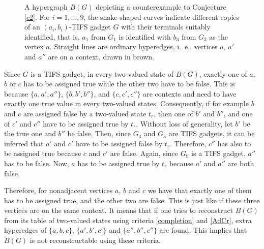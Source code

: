 \documentclass[%
12pt,
prereprint,
showpacs,
showkeys,
preprintnumbers,
amsmath,amssymb,
aps,
pra,
longbibliography,
notitlepage
]{revtex4-1}
\theoremstyle{definition}
\begin{document}
\begin{figure}
\begin{center}
{
			}
		\end{center}
		\caption{\label{TIFS-non-Rec}
			A hypergraph $B(G)$ depicting a counterexample to Conjecture \ref{c2}. For $i=1,\ldots ,9$, the snake-shaped curves indicate different copies of an $(a_i , b_i )$-TIFS gadget $G$ with their terminals suitably identified, that is, $a_1$ from $G_1$ is identified with $b_3$ from $G_3$ as the vertex $a$. Straight lines are ordinary hyperedges, i.~e., vertices $a$, $a'$ and $a''$ are on a context, drawn in brown.}
	\end{figure}
	
	Since $G$ is a TIFS gadget, in every two-valued state of $B(G)$, exactly one of $a$, $b$ or $c$ has to be assigned true while the other two have to be false. This is because $\{a,a',a''\}$, $\{b,b',b''\}$, and $\{c,c',c''\}$ are contexts and need to have exactly one true value in every two-valued states. Consequently, if for example $b$ and $c$ are assigned false by a two-valued state $t_r$, then one of $b'$ and $b''$, and one of $c'$ and $c''$ have to be assigned true by $t_r$. Without loss of generality, let $b'$ be the true one and $b''$ be false. Then, since $G_4$ and $G_5$ are TIFS gadgets, it can be inferred that $a'$ and $c'$ have to be assigned false by $t_r$. Therefore, $c''$ has also to be assigned true because $c$ and $c'$ are false. Again, since $G_9$ is a TIFS gadget, $a''$ has to be false. Now, $a$ has to be assigned true by $t_r$ because $a'$ and $a''$ are both false.
	
	Therefore, for nonadjacent vertices $a$, $b$ and $c$ we have that exactly one of them has to be assigned true, and the other two are false. This is just like if these three vertices are on the same context. It means that if one tries to reconstruct $B(G)$ from its table of two-valued states using criteria \ref{completion} and \ref{AdCr},  extra hyperedges of $\{a,b,c\}$, $\{a',b',c'\}$ and $\{a'',b'',c''\}$ are found. This implies that $B(G)$ is not reconstructable using these criteria.
	
\end{document}

